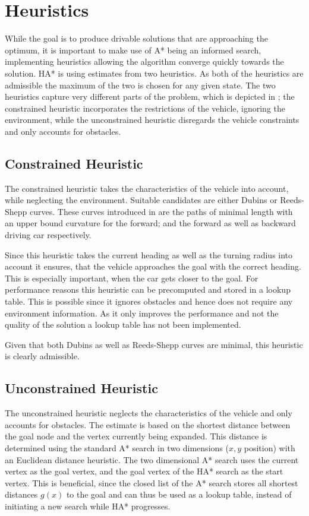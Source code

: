 \section{Heuristics}
While the goal is to produce drivable solutions that are approaching the optimum, it is important to make use of A* being an informed search, implementing heuristics allowing the algorithm converge quickly towards the solution. HA* is using estimates from two heuristics. As both of the heuristics are admissible the maximum of the two is chosen for any given state. The two heuristics capture very different parts of the problem, which is depicted in ; the constrained heuristic incorporates the restrictions of the vehicle, ignoring the environment, while the unconstrained heuristic disregards the vehicle constraints and only accounts for obstacles.

\subsection{Constrained Heuristic}
The constrained heuristic takes the characteristics of the vehicle into account, while neglecting the environment. Suitable candidates are either Dubins or Reeds-Shepp curves. These curves introduced in  are the paths of minimal length with an upper bound curvature for the forward; and the forward as well as backward driving car respectively.

Since this heuristic takes the current heading as well as the turning radius into account it ensures, that the vehicle approaches the goal with the correct heading. This is especially important, when the car gets closer to the goal. For performance reasons this heuristic can be precomputed and stored in a lookup table. This is possible since it ignores obstacles and hence does not require any environment information. As it only improves the performance and not the quality of the solution a lookup table has not been implemented. %

Given that both Dubins as well as Reeds-Shepp curves are minimal, this heuristic is clearly admissible.

\subsection{Unconstrained Heuristic}
The unconstrained heuristic neglects the characteristics of the vehicle and only accounts for obstacles. The estimate is based on the shortest distance between the goal node and the vertex currently being expanded. This distance is determined using the standard A* search in two dimensions ($x,y$ position) with an Euclidean distance heuristic.
The two dimensional A* search uses the current vertex as the goal vertex, and the goal vertex of the HA* search as the start vertex. This is beneficial, since the closed list of the A* search stores all shortest distances $g(x)$ to the goal and can thus be used as a lookup table, instead of initiating a new search while HA* progresses.

